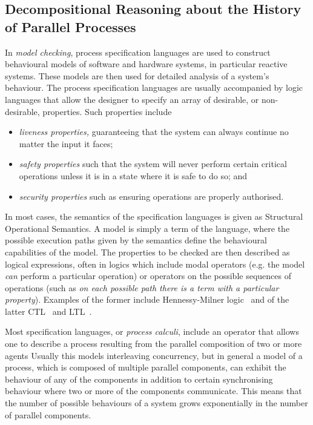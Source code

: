 
\subsection{Decompositional Reasoning about the History of Parallel Processes} %

In \emph{model checking}, process specification languages are used to construct
behavioural models of software and hardware systems, in particular reactive
systems. These models are then used
for detailed analysis of a system's behaviour. The process specification languages
are usually accompanied by logic languages that allow the designer to specify an
array of desirable, or non-desirable, properties. Such properties include 
\begin{itemize}
    \item \emph{liveness properties,} guaranteeing that the system can always 
    continue no matter the input it faces;
    \item \emph{safety properties} such that the system will never perform certain critical
    operations unless it is in a state where it is safe to do so; and
    \item \emph{security properties} such as ensuring operations are properly authorised.
\end{itemize}

In most cases, the semantics of the specification languages is given as Structural
Operational Semantics. A model is simply a term of the language, where the possible
execution paths given by the semantics define the behavioural capabilities of
the model. The properties to be checked are then described as logical expressions,
often in logics which include modal operators (e.g. the model \emph{can} perform
a particular operation) or operators on the possible sequences of operations (such
as \emph{on each possible path there is a term with a particular property}).
Examples of the former include Hennessy-Milner logic~\cite{Hennessy85} 
and of the latter CTL~\cite{CE81} and LTL~\cite{Pnueli77}.

Most specification languages, or \emph{process calculi}, 
include an operator that allows one to describe a process resulting from the 
parallel composition of two or more agents
Usually this models interleaving
concurrency, but in general a model of a process, which is composed of multiple
parallel components, can exhibit the behaviour of any of the components in addition
to certain synchronising behaviour where two or more of the components communicate.
This means that the number of possible behaviours of a system grows exponentially
in the number of parallel components.

